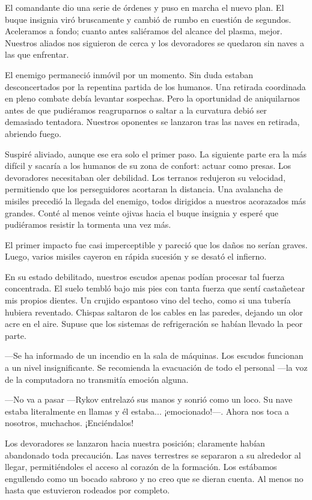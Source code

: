 El comandante dio una serie de órdenes y puso en marcha el nuevo plan. El buque insignia viró bruscamente y cambió de rumbo en cuestión de segundos. Aceleramos a fondo; cuanto antes saliéramos del alcance del plasma, mejor. Nuestros aliados nos siguieron de cerca y los devoradores se quedaron sin naves a las que enfrentar.

El enemigo permaneció inmóvil por un momento. Sin duda estaban desconcertados por la repentina partida de los humanos. Una retirada coordinada en pleno combate debía levantar sospechas. Pero la oportunidad de aniquilarnos antes de que pudiéramos reagruparnos o saltar a la curvatura debió ser demasiado tentadora. Nuestros oponentes se lanzaron tras las naves en retirada, abriendo fuego.

Suspiré aliviado, aunque ese era solo el primer paso. La siguiente parte era la más difícil y sacaría a los humanos de su zona de confort: actuar como presas. Los devoradores necesitaban oler debilidad. Los terranos redujeron su velocidad, permitiendo que los perseguidores acortaran la distancia. Una avalancha de misiles precedió la llegada del enemigo, todos dirigidos a nuestros acorazados más grandes. Conté al menos veinte ojivas hacia el buque insignia y esperé que pudiéramos resistir la tormenta una vez más.

El primer impacto fue casi imperceptible y pareció que los daños no serían graves. Luego, varios misiles cayeron en rápida sucesión y se desató el infierno.

En su estado debilitado, nuestros escudos apenas podían procesar tal fuerza concentrada. El suelo tembló bajo mis pies con tanta fuerza que sentí castañetear mis propios dientes. Un crujido espantoso vino del techo, como si una tubería hubiera reventado. Chispas saltaron de los cables en las paredes, dejando un olor acre en el aire. Supuse que los sistemas de refrigeración se habían llevado la peor parte.

—Se ha informado de un incendio en la sala de máquinas. Los escudos funcionan a un nivel insignificante. Se recomienda la evacuación de todo el personal —la voz de la computadora no transmitía emoción alguna.

—No va a pasar —Rykov entrelazó sus manos y sonrió como un loco. Su nave estaba literalmente en llamas y él estaba... ¡emocionado!—. Ahora nos toca a nosotros, muchachos. ¡Enciéndalos!

Los devoradores se lanzaron hacia nuestra posición; claramente habían abandonado toda precaución. Las naves terrestres se separaron a su alrededor al llegar, permitiéndoles el acceso al corazón de la formación. Los estábamos engullendo como un bocado sabroso y no creo que se dieran cuenta. Al menos no hasta que estuvieron rodeados por completo.

